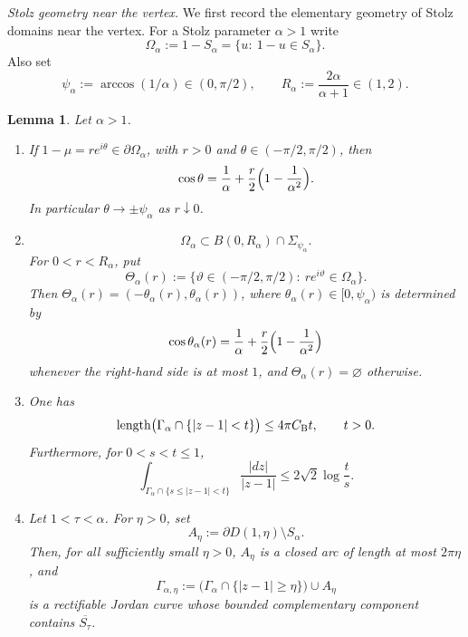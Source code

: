 \documentclass[11pt]{amsart}
\numberwithin{equation}{section}
\newtheorem{lemma}[theorem]{Lemma}
\theoremstyle{definition}
\theoremstyle{plain}
\begin{document}
\noindent\emph{Stolz geometry near the vertex.}
We first record the elementary geometry of Stolz domains near the vertex.
For a Stolz parameter \(\alpha>1\) write
\[
        \Omega_\alpha:=1-S_\alpha=\{u:\ 1-u\in S_\alpha\}.
\]
Also set
\[
        \psi_\alpha:=\arccos(1/\alpha)\in(0,\pi/2),
        \qquad
        R_\alpha:=\frac{2\alpha}{\alpha+1}\in(1,2).
\]

\begin{lemma}\label{lem:geometry}
Let \(\alpha>1\).
\begin{enumerate}[label=\textnormal{(\roman*)}]
\item If \(1-\mu=r e^{i\theta}\in\partial\Omega_\alpha\), with
\(r>0\) and \(\theta\in(-\pi/2,\pi/2)\), then
\begin{equation}\label{eq:costheta}
        \cos\theta
        =
        \frac1\alpha+\frac r2\Bigl(1-\frac1{\alpha^2}\Bigr).
\end{equation}
In particular \(\theta\to\pm\psi_\alpha\) as \(r\downarrow0\).
\item
\[
        \Omega_\alpha\subset B(0,R_\alpha)\cap \Sigma_{\psi_\alpha}.
\]
For \(0<r<R_\alpha\), put
\[
        \Theta_\alpha(r)
        :=\{\vartheta\in(-\pi/2,\pi/2):\ r e^{i\vartheta}\in\Omega_\alpha\}.
\]
Then \(\Theta_\alpha(r)=(-\theta_\alpha(r),\theta_\alpha(r))\), where
\(\theta_\alpha(r)\in[0,\psi_\alpha)\) is determined by
\[
        \cos\theta_\alpha(r)
        =
        \frac1\alpha+\frac r2\Bigl(1-\frac1{\alpha^2}\Bigr)
\]
whenever the right-hand side is at most \(1\), and
\(\Theta_\alpha(r)=\varnothing\) otherwise.
\item 
One has
\begin{equation}\label{eq:Stolz-local-length-main}
        \operatorname{length}\bigl(\Gamma_\alpha\cap\{|z-1|<t\}\bigr)
        \le 4 \pi C_{\rm B}t,\qquad t>0.
\end{equation}
Furthermore, for \(0<s<t\le 1\),
\[
        \int_{\Gamma_\alpha\cap\{s\le |z-1|<t\}}
             \frac{|dz|}{|z-1|}
        \le 2\sqrt2 \log \frac{t}{s}.
\]
\item Let \(1<\tau<\alpha\). For \(\eta>0\), set
\[
        A_\eta:=\partial D(1,\eta)\setminus S_\alpha.
\]
Then, for all sufficiently small \(\eta>0\), \(A_\eta\) is a closed arc
of length at most \(2\pi\eta\), and
\begin{equation}\label{curve}
        \Gamma_{\alpha,\eta}
        :=
        \bigl(\Gamma_\alpha\cap\{|z-1|\ge\eta\}\bigr)\cup A_\eta
\end{equation}
is a rectifiable Jordan curve
whose bounded complementary component
contains \(\overline{S_\tau}\).


\end{enumerate}
\end{lemma}
\end{document}
